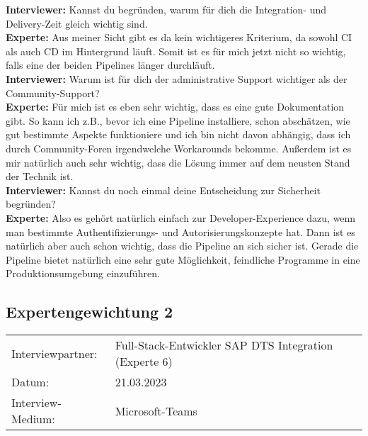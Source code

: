 \begin{linenumbers}
            \textbf{Interviewer:} Kannst du begründen, warum für dich die Integration- und Delivery-Zeit gleich wichtig sind.\\
            \textbf{Experte:} Aus meiner Sicht gibt es da kein wichtigeres Kriterium, da sowohl CI als auch CD im Hintergrund läuft. Somit ist es für mich jetzt nicht so wichtig, falls eine der beiden Pipelines länger durchläuft.\\
            \textbf{Interviewer:} Warum ist für dich der administrative Support wichtiger als der Community-Support?\\
            \textbf{Experte:} Für mich ist es eben sehr wichtig, dass es eine gute Dokumentation gibt. So kann ich z.B., bevor ich eine Pipeline installiere, schon abschätzen, wie gut bestimmte Aspekte funktioniere und ich bin nicht davon abhängig, dass ich durch Community-Foren irgendwelche Workarounds bekomme. Außerdem ist es mir natürlich auch sehr wichtig, dass die Lösung immer auf dem neusten Stand der Technik ist.\\
            \textbf{Interviewer:} Kannst du noch einmal deine Entscheidung zur Sicherheit begründen?\\
            \textbf{Experte:} Also es gehört natürlich einfach zur Developer-Experience dazu, wenn man bestimmte Authentifizierungs- und Autorisierungskonzepte hat. Dann ist es natürlich aber auch schon wichtig, dass die Pipeline an sich sicher ist. Gerade die Pipeline bietet natürlich eine sehr gute Möglichkeit, feindliche Programme in eine Produktionsumgebung einzuführen.\\
    \end{linenumbers}
    

    
    \newpage
    \subsection{Expertengewichtung 2}
            \begin{tabular}{ l l }
        Interviewpartner: & Full-Stack-Entwickler SAP DTS Integration (Experte 6)\\
        Datum: & 21.03.2023\\
        Interview-Medium: & Microsoft-Teams\\
\end{tabular}
\begin{center}
    \begin{figure}[H]
        \centering
        \label{fig:gew_21}
    \end{figure}	
\end{center}
\begin{center}
    \begin{figure}[H]
        \centering
        \label{fig:gew_22}
    \end{figure}	
\end{center}

